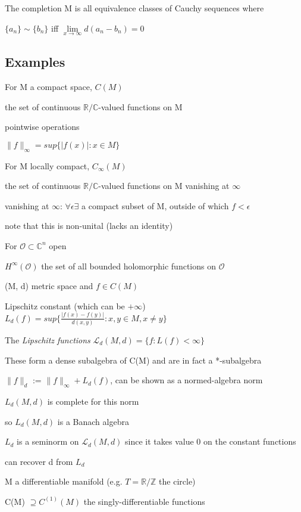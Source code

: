 \documentclass[12pt]{article}
\begin{document}
\noindent
The completion M is all equivalence classes of Cauchy sequences where 

$\{a_n\} \sim \{b_n\}$ iff $\lim\limits_{x \to \infty}d(a_n - b_n) = 0$

\subsection{Examples}

\noindent
For M a compact space, $C(M)$

the set of continuous $\mathds{R}/\mathds{C}$-valued functions on M

pointwise operations

$\|f\|_\infty = sup \{|f(x)| : x \in M\}$

\noindent
For M locally compact, $C_\infty(M)$

the set of continuous $\mathds{R}/\mathds{C}$-valued functions on M vanishing at $\infty$

vanishing at $\infty$: $\forall \epsilon \exists$ a compact subset of M, outside of which $f < \epsilon$

note that this is non-unital (lacks an identity)

\noindent
For $\mathscr{O} \subset \mathds{C}^n$ open

$H^\infty(\mathscr{O})$ the set of all bounded holomorphic functions on $\mathscr{O}$

\noindent
(M, d) metric space and $f \in C(M)$

Lipschitz constant (which can be $+\infty$) $L_d(f) = sup\{\frac{|f(x) - f(y)|}{d(x, y)} : x, y \in M, x \neq y\}$

The \textit{Lipschitz functions} $\mathscr{L}_d(M, d) = \{f: L(f) < \infty\}$

These form a dense subalgebra of C(M) and are in fact a *-subalgebra

$\|f\|_d$ := $\|f\|_\infty + L_d(f)$, can be shown as a normed-algebra norm

$L_d(M, d)$ is complete for this norm

so $L_d(M, d)$ is a Banach algebra

$L_d$ is a seminorm on $\mathscr{L}_d(M, d)$ since it takes value 0 on the constant functions

can recover d from $L_d$

\noindent
M a differentiable manifold (e.g. $T = \mathds{R}\slash\mathds{Z}$ the circle)

C(M) $\supseteq C^{(1)}(M)$ the singly-differentiable functions
\end{document}
